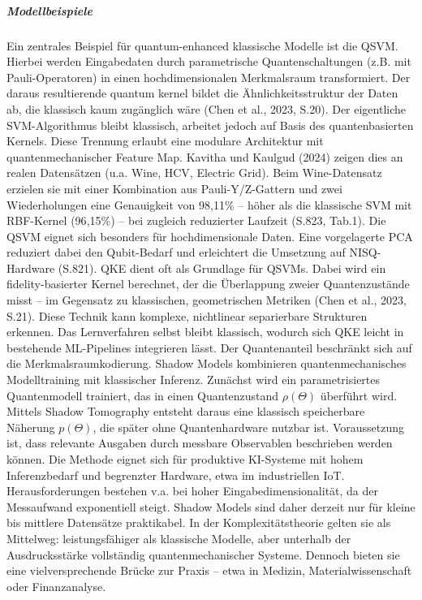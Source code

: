 \subparagraph{Modellbeispiele}
Ein zentrales Beispiel für quantum-enhanced klassische Modelle ist die QSVM. Hierbei werden Eingabedaten durch parametrische Quantenschaltungen (z.B. mit Pauli-Operatoren) in einen hochdimensionalen Merkmalsraum transformiert. Der daraus resultierende quantum kernel bildet die Ähnlichkeitsstruktur der Daten ab, die klassisch kaum zugänglich wäre (Chen et al., 2023, S.20).
Der eigentliche SVM-Algorithmus bleibt klassisch, arbeitet jedoch auf Basis des quantenbasierten Kernels. Diese Trennung erlaubt eine modulare Architektur mit quantenmechanischer Feature Map.
Kavitha und Kaulgud (2024) zeigen dies an realen Datensätzen (u.a. Wine, HCV, Electric Grid). Beim Wine-Datensatz erzielen sie mit einer Kombination aus Pauli-Y/Z-Gattern und zwei Wiederholungen eine Genauigkeit von 98{,}11\% – höher als die klassische SVM mit RBF-Kernel (96{,}15\%) – bei zugleich reduzierter Laufzeit (S.823, Tab.1).
Die QSVM eignet sich besonders für hochdimensionale Daten. Eine vorgelagerte PCA reduziert dabei den Qubit-Bedarf und erleichtert die Umsetzung auf NISQ-Hardware (S.821). 
QKE dient oft als Grundlage für QSVMs. Dabei wird ein fidelity-basierter Kernel berechnet, der die Überlappung zweier Quantenzustände misst – im Gegensatz zu klassischen, geometrischen Metriken (Chen et al., 2023, S.21).
Diese Technik kann komplexe, nichtlinear separierbare Strukturen erkennen. Das Lernverfahren selbst bleibt klassisch, wodurch sich QKE leicht in bestehende ML-Pipelines integrieren lässt. Der Quantenanteil beschränkt sich auf die Merkmalsraumkodierung. 
Shadow Models kombinieren quantenmechanisches Modelltraining mit klassischer Inferenz. Zunächst wird ein parametrisiertes Quantenmodell trainiert, das in einen Quantenzustand $\rho(\Theta)$ überführt wird. Mittels Shadow Tomography entsteht daraus eine klassisch speicherbare Näherung $p(\Theta)$, die später ohne Quantenhardware nutzbar ist. Voraussetzung ist, dass relevante Ausgaben durch messbare Observablen beschrieben werden können.
Die Methode eignet sich für produktive KI-Systeme mit hohem Inferenzbedarf und begrenzter Hardware, etwa im industriellen IoT.
Herausforderungen bestehen v.a. bei hoher Eingabedimensionalität, da der Messaufwand exponentiell steigt. Shadow Models sind daher derzeit nur für kleine bis mittlere Datensätze praktikabel.
In der Komplexitätstheorie gelten sie als Mittelweg: leistungsfähiger als klassische Modelle, aber unterhalb der Ausdrucksstärke vollständig quantenmechanischer Systeme. Dennoch bieten sie eine vielversprechende Brücke zur Praxis – etwa in Medizin, Materialwissenschaft oder Finanzanalyse.

